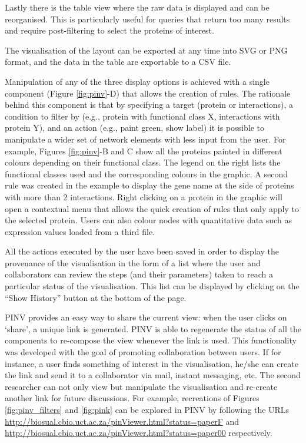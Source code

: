 Lastly there is the table view where the raw data is displayed and can be reorganised. This is particularly useful for queries that return too many results and require post-filtering to select the proteins of interest.

The visualisation of the layout can be exported at any time into SVG or PNG format, and the data in the table are exportable to a CSV file.

Manipulation of any of the three display options is achieved with a single component (Figure \ref{fig:pinv}-D) that allows the creation of rules. The rationale behind this component is that by specifying a target (protein or interactions), a condition to filter by (e.g., protein with functional class X, interactions with protein Y), and an action (e.g., paint green, show label) it is possible to manipulate a wider set of network elements with less input from the user. For example, Figures \ref{fig:pinv}-B and C show all the proteins painted in different colours depending on their functional class. The legend on the right lists the functional classes used and the corresponding colours in the graphic. A second rule was created in the example to display the gene name at the side of proteins with more than 2 interactions.
Right clicking on a protein in the graphic will open a contextual menu that allows the quick creation of rules that only apply to the selected protein. Users can also colour nodes with quantitative data such as expression values loaded from a third file.

All the actions executed by the user have been saved in order to display the provenance of the visualisation in the form of a list where the user and collaborators can review the steps (and their parameters) taken to reach a particular status of the visualisation. This list can be displayed by clicking on the “Show History” button at the bottom of the page. 

PINV provides an easy way to share the current view: when the user clicks on `share', a unique link is generated. PINV is able to regenerate the status of all the components to re-compose the view whenever the link is used. 
This functionality was developed with the goal of promoting collaboration between users. If for instance, a user finds something of interest in the visualisation, he/she can create the link and send it to a collaborator via mail, instant messaging, etc. The second researcher can not only view but manipulate the visualisation and re-create another link for future discussions. For example, recreations of Figures \ref{fig:pinv_filters} and \ref{fig:pink} can be explored in PINV by following the URLs \url{http://biosual.cbio.uct.ac.za/pinViewer.html?status=paperF} and \url{http://biosual.cbio.uct.ac.za/pinViewer.html?status=paper00} respectively.

